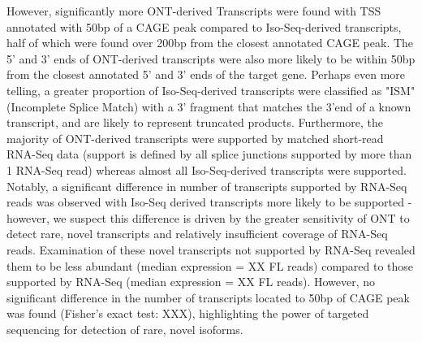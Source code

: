However, significantly more ONT-derived Transcripts were found with TSS annotated with 50bp of a CAGE peak compared to Iso-Seq-derived transcripts, half of which were found over 200bp from the closest annotated CAGE peak. The 5' and 3' ends of ONT-derived transcripts were also more likely to be within 50bp from the closest annotated 5' and 3' ends of the target gene. Perhaps even more telling, a greater proportion of Iso-Seq-derived transcripts were classified as "ISM" (Incomplete Splice Match) with a 3' fragment that matches the 3'end of a known transcript, and are likely to represent truncated products. Furthermore, the majority of ONT-derived transcripts were supported by matched short-read RNA-Seq data (support is defined by all splice junctions supported by more than 1 RNA-Seq read) whereas almost all Iso-Seq-derived transcripts were supported. Notably, a significant difference in number of transcripts supported by RNA-Seq reads was observed with Iso-Seq derived transcripts more likely to be supported - however, we suspect this difference is driven by the greater sensitivity of ONT to detect rare, novel transcripts and relatively insufficient coverage of RNA-Seq reads. Examination of these novel transcripts not supported by RNA-Seq revealed them to be less abundant (median expression = XX FL reads) compared to those supported by RNA-Seq (median expression = XX FL reads).  However, no significant difference in the number of transcripts located to 50bp of CAGE peak was found (Fisher's exact test: XXX), highlighting the power of targeted sequencing for detection of rare, novel isoforms. 

